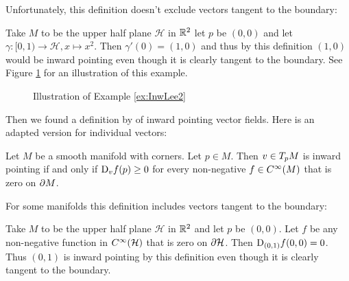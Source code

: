 Unfortunately, this definition doesn't exclude vectors tangent to the boundary: 

\begin{example}\label{ex:InwLee2}
    Take $M$ to be the upper half plane $\mathcal{H}$ in $\mathbb{R}^2$ let $p$ be $(0, 0)$ and let $\gamma \colon [0, 1) \to \mathcal{H}, x \mapsto x^2$. 
    Then $\gamma'(0) = (1, 0)$ and thus by this definition $(1, 0)$ would be inward pointing even though it is clearly tangent to the boundary.
    See Figure \ref{fig:InwLee2} for an illustration of this example. 
\end{example}

\begin{figure}
\centering
{}
\caption{Illustration of Example \ref{ex:InwLee2}}
\label{fig:InwLee2}
\end{figure}

Then we found a definition by \citeauthor{Melrose1996} of inward pointing vector fields. Here is an adapted version for individual vectors:  

\begin{defi}\label{defi:InwMelrose}
    Let $M$ be a smooth manifold with corners. Let $p \in M$. Then $v \in T_{p}M$ is inward pointing if and only if $\text{D}_{v}f (p) \ge 0$ for every non-negative $f \in C^\infty(M)$ that is zero on $\partial{M}$. 
\end{defi}

For some manifolds this definition includes vectors tangent to the boundary: 

\begin{example}
    Take $M$ to be the upper half plane $\mathcal{H}$ in $\mathbb{R}^2$ and let $p$ be $(0, 0)$. 
    Let $f$ be any non-negative function in $C^\infty(\mathcal{H})$ that is zero on $\partial{\mathcal{H}}$. 
    Then $\text{D}_{(0, 1)}f (0, 0) = 0$. 
    Thus $(0, 1)$ is inward pointing by this definition even though it is clearly tangent to the boundary. 
\end{example}

